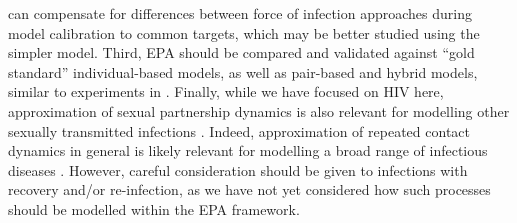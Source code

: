 can compensate for differences between force of infection approaches
during model calibration to common targets,
which may be better studied using the simpler model.
Third, EPA should be compared and validated against
``gold standard'' individual-based models, as well as pair-based and hybrid models,
similar to experiments in \cite{Johnson2016mf}.
Finally, while we have focused on HIV here,
approximation of sexual partnership dynamics is also relevant for
modelling other sexually transmitted infections \cite{??}.
Indeed, approximation of repeated contact dynamics in general is likely relevant for
modelling a broad range of infectious diseases \cite{Pung2024temp}.
However, careful consideration should be given to
infections with recovery and/or re-infection,
as we have not yet considered how such processes
should be modelled within the EPA framework.
